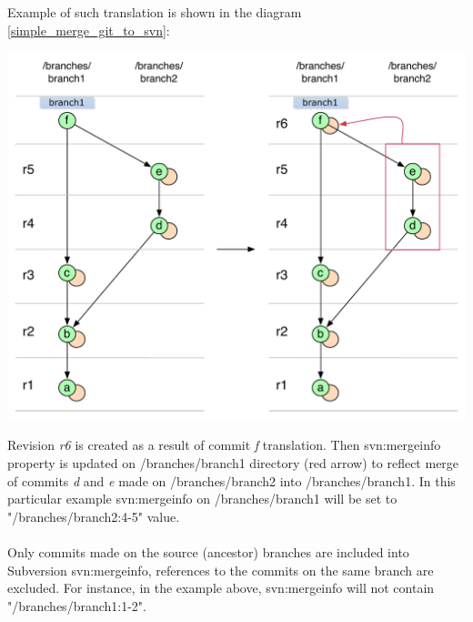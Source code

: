 Example of such translation is shown in the diagram \ref{simple_merge_git_to_svn}:

\begin{center}
\includegraphics[width=\textwidth]{img/diagrams/simple_merge_git_to_svn.pdf}%
\label{simple_merge_git_to_svn}%
\end{center}

Revision \emph{r6} is created as a result of commit \emph{f} translation. Then svn:mergeinfo property is updated on /branches/branch1 directory
(red arrow) to reflect merge of commits \emph{d} and \emph{e} made on /branches/branch2 into /branches/branch1. In this 
particular example svn:mergeinfo on /branches/branch1 will be set to "/branches/branch2:4-5" value.
\\\\
Only commits made on the source (ancestor) branches are included into Subversion svn:mergeinfo, references to the commits on the same branch
are excluded. For instance, in the example above, svn:mergeinfo will not contain "/branches/branch1:1-2".

